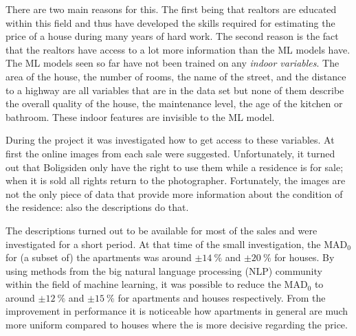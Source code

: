 There are two main reasons for this. The first being that realtors are educated within this field and thus have developed the skills required for estimating the price of a house during many years of hard work. The second reason is the fact that the realtors have access to a lot more information than the ML models have. The ML models seen so far have not been trained on any \emph{indoor variables}. The area of the house, the number of rooms, the name of the street, and the distance to a highway are all variables that are in the data set but none of them describe the overall quality of the house, the maintenance level, the age of the kitchen or bathroom. These indoor features are invisible to the ML model. 

During the project it was investigated how to get access to these variables. At first the online images from each sale were suggested. Unfortunately, it turned out that Boligsiden only have the right to use them while a residence is for sale; when it is sold all rights return to the photographer. Fortunately, the images are not the only piece of data that provide more information about the condition of the residence: also the descriptions do that. 

The descriptions turned out to be available for most of the sales and were investigated for a short period. At that time of the small investigation, the $\mathrm{MAD}_0$ for (a subset of) the apartments was around $\pm \SI{14}{\percent}$ and $\pm \SI{20}{\percent}$ for houses. By using methods from the big natural language processing (NLP) community within the field of machine learning, it was possible to reduce the $\mathrm{MAD}_0$ to around $\pm \SI{12}{\percent}$ and $\pm \SI{15}{\percent}$ for apartments and houses respectively. From the improvement in performance it is noticeable how apartments in general are much more uniform compared to houses where the  is more decisive regarding the price. 


